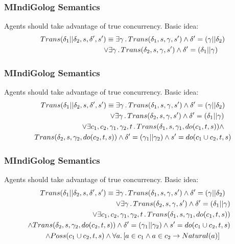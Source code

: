\documentclass{beamer}
\begin{document}
\begin{frame}
\frametitle{MIndiGolog Semantics}
Agents should take advantage of true concurrency. Basic idea:
\begin{multline*}
Trans(\delta_{1}||\delta_{2},s,\delta',s')\equiv\exists\gamma\,.\, Trans(\delta_{1},s,\gamma,s')\wedge\delta'=(\gamma||\delta_{2})\\
\shoveright{\vee\exists\gamma\,.\, Trans(\delta_{2},s,\gamma,s')\wedge\delta'=(\delta_{1}||\gamma)}\\
\end{multline*}
\end{frame}

\begin{frame}
\frametitle{MIndiGolog Semantics}
Agents should take advantage of true concurrency. Basic idea:
\begin{multline*}
Trans(\delta_{1}||\delta_{2},s,\delta',s')\equiv\exists\gamma\,.\, Trans(\delta_{1},s,\gamma,s')\wedge\delta'=(\gamma||\delta_{2})\\
\shoveright{\vee\exists\gamma\,.\, Trans(\delta_{2},s,\gamma,s')\wedge\delta'=(\delta_{1}||\gamma)}\\
\shoveright{\vee\exists c_{1},c_{2},\gamma_{1},\gamma_{2},t\,.\, Trans(\delta_{1},s,\gamma_{1},do(c_{1},t,s))\wedge}\\ 
Trans(\delta_{2},s,\gamma_{2},do(c_{2},t,s))\wedge\delta'=(\gamma_{1}||\gamma_{2})\wedge s'=do(c_{1}\cup c_{2},t,s)
\end{multline*}
\end{frame}

\begin{frame}
\frametitle{MIndiGolog Semantics}
Agents should take advantage of true concurrency. Basic idea:
\begin{multline*}
Trans(\delta_{1}||\delta_{2},s,\delta',s')\equiv\exists\gamma\,.\, Trans(\delta_{1},s,\gamma,s')\wedge\delta'=(\gamma||\delta_{2})\\
\shoveright{\vee\exists\gamma\,.\, Trans(\delta_{2},s,\gamma,s')\wedge\delta'=(\delta_{1}||\gamma)}\\
\shoveright{\vee\exists c_{1},c_{2},\gamma_{1},\gamma_{2},t\,.\, Trans(\delta_{1},s,\gamma_{1},do(c_{1},t,s))}\\
\shoveright{\wedge Trans(\delta_{2},s,\gamma_{2},do(c_{2},t,s))\wedge\delta'=(\gamma_1||\gamma_2)\wedge s'=do(c_1\cup c_2,t,s)}\\
\wedge Poss(c_1\cup c_2,t,s)\wedge\forall a.\left[a\in c_{1}\wedge a\in c_{2}\rightarrow Natural(a)\right]
\end{multline*}
\end{frame}
\end{document}
